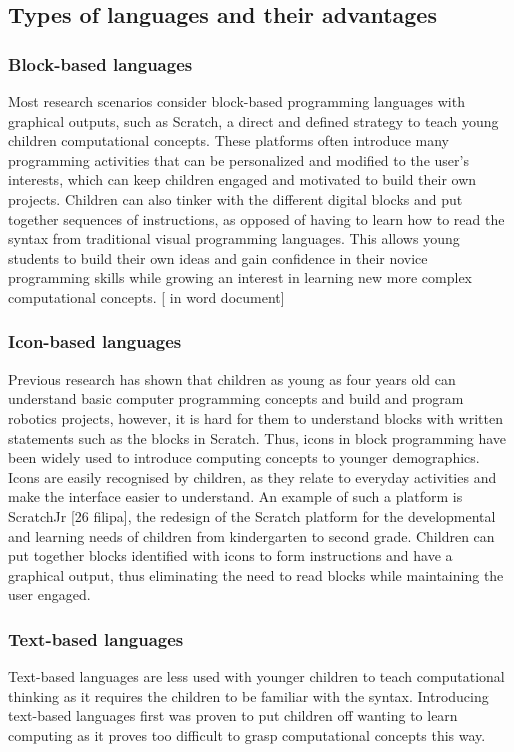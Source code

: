 \documentclass[oneside,%
                    author={Malak Hajji},
                    degree={BSc},
                    title={Designing An Accessible Computational Toolkit For Students},
                  subtitle={With Mixed Visual Abilities}]{dissertation}
\begin{document}
\subsection{Types of languages and their advantages}
\subsubsection{Block-based languages}
Most research scenarios consider block-based programming languages with graphical outputs, such as Scratch, a direct and defined strategy to teach young children computational concepts. These platforms often introduce many programming activities that can be personalized and modified to the user's interests, which can keep children engaged and motivated to build their own projects. Children can also tinker with the different digital blocks and put together sequences of instructions, as opposed of having to learn how to read the syntax from traditional visual programming languages. This allows young students to build their own ideas and gain confidence in their novice programming skills while growing an interest in learning new more complex computational concepts. [ in word document]

\subsubsection{Icon-based languages}
Previous research has shown that children as young as four years old can understand basic computer programming concepts and build and program robotics projects, however, it is hard for them to understand blocks with written statements such as the blocks in Scratch. Thus, icons in block programming have been widely used to introduce computing concepts to younger demographics. Icons are easily recognised by children, as they relate to everyday activities and make the interface easier to understand.
An example of such a platform is ScratchJr [26 filipa], the redesign of the Scratch platform for the developmental and learning needs of children from kindergarten to second grade. Children can put together blocks identified with icons to form instructions and have a graphical output, thus eliminating the need to read blocks while maintaining the user engaged.

\subsubsection{Text-based languages}

Text-based languages are less used with younger children to teach computational thinking as it requires the children to be familiar with the syntax. Introducing text-based languages first was proven to put children off wanting to learn computing as it proves too difficult to grasp computational concepts this way.
 
\end{document}
